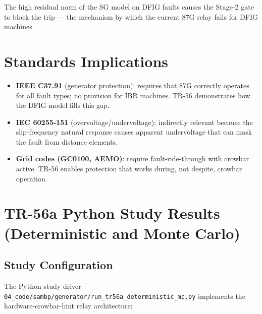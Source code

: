 \documentclass[11pt,a4paper]{article}
\begin{document}
The high residual norm of the SG model on DFIG faults causes the Stage-2
gate to block the trip — the mechanism by which the current 87G relay fails
for DFIG machines.

\section{Standards Implications}
\label{sec:standards}

\begin{itemize}
  \item \textbf{IEEE C37.91} (generator protection): requires that 87G
        correctly operates for all fault types; no provision for IBR machines.
        TR-56 demonstrates how the DFIG model fills this gap.

  \item \textbf{IEC 60255-151} (overvoltage/undervoltage): indirectly
        relevant because the slip-frequency natural response causes
        apparent undervoltage that can mask the fault from distance elements.

  \item \textbf{Grid codes (GC0100, AEMO)}: require fault-ride-through with
        crowbar active.  TR-56 enables protection that works during, not
        despite, crowbar operation.
\end{itemize}

\section{TR-56a Python Study Results (Deterministic and Monte Carlo)}
\label{sec:tr56a}

\subsection{Study Configuration}

The Python study driver
\texttt{04\_code/sambp/generator/run\_tr56a\_deterministic\_mc.py}
implements the hardware-crowbar-hint relay architecture:
\end{document}
